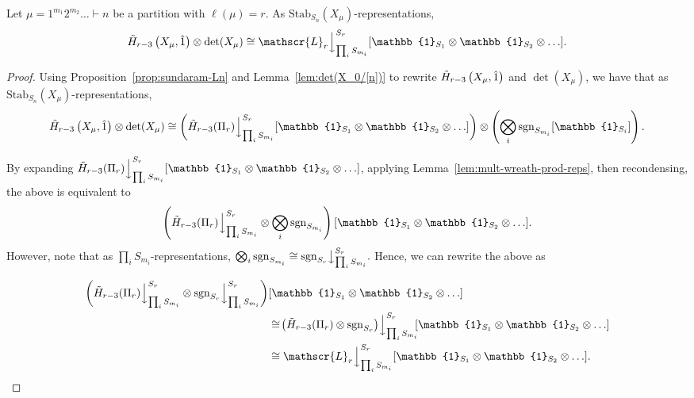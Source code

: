 \documentclass[ALCO, Unicode]{cedram}
\def\stab{\mathrm{Stab}}
\def\sgn{\mathrm{sgn}}
\begin{document}
\begin{coro}\label{lem:upper-interval-stabilizer-rep}
    Let $\mu = 1^{m_1}2^{m_2}\ldots \vdash n$ be a partition with $\ell(\mu) = r.$ As $\stab_{S_n}(X_\mu)$-representations,
    \begin{align*}
        \Tilde{H}_{r - 3}\left(X_\mu, \hat{1}\right) \otimes \det(X_\mu) \cong \mathscr{L}_r \Big \downarrow^{S_r}_{\prod_{i} S_{m_i}}[\mathbb{1}_{S_1} \otimes \mathbb{1}_{S_2} \otimes \ldots].
    \end{align*}
\end{coro}
\begin{proof}
     Using Proposition~\ref{prop:sundaram-Ln} and Lemma~\ref{lem:det(X_0/[n])} to rewrite $\Tilde{H}_{r - 3}\left(X_\mu, \hat{1}\right)$ and $\det(X_\mu)$, we have that as $\stab_{S_n}(X_\mu)$-representations,
 {\small \begin{align*}
     \Tilde{H}_{r - 3}\left(X_\mu, \hat{1}\right) \otimes \det(X_\mu) \cong \left(\Tilde{H}_{r - 3}(\Pi_r) \Big \downarrow^{S_r}_{\prod_{i} S_{m_i}}[\mathbb{1}_{S_1} \otimes \mathbb{1}_{S_2} \otimes \ldots ]\right) \otimes \left(\bigotimes_i \sgn_{S_{m_i}}[\mathbb{1}_{S_i}]\right).
 \end{align*}}

 By expanding $\Tilde{H}_{r - 3}(\Pi_r) \Big \downarrow^{S_r}_{\prod_{i} S_{m_i}}[\mathbb{1}_{S_1} \otimes \mathbb{1}_{S_2} \otimes \ldots ]$, applying Lemma~\ref{lem:mult-wreath-prod-reps}, then recondensing, the above is equivalent to
\begin{align*}
    \left(\Tilde{H}_{r - 3}(\Pi_r) \Big \downarrow^{S_r}_{\prod_{i} S_{m_i}} \otimes \bigotimes_i \sgn_{S_{m_i}}\right)[\mathbb{1}_{S_1} \otimes \mathbb{1}_{S_2} \otimes \ldots ].
\end{align*}
However, note that as $\prod_i S_{m_i}$-representations, $\bigotimes_i \sgn_{S_{m_i}} \cong \sgn_{S_r} \big\downarrow^{S_r}_{\prod_iS_{m_i}}.$ Hence, we can rewrite the above as 
 
\begin{align*}
     \left(\Tilde{H}_{r - 3}(\Pi_r) \Big \downarrow^{S_r}_{\prod_{i} S_{m_i}} \otimes \sgn_{S_r} \Big \downarrow^{S_r}_{\prod_i S_{m_i}}\right)&[\mathbb{1}_{S_1} \otimes \mathbb{1}_{S_2} \otimes \ldots ]\\
     &\cong\! \left(\Tilde{H}_{r - 3}(\Pi_r) \otimes \sgn_{S_r} \right)\!\Big \downarrow^{S_r}_{\prod_{i } S_{m_i}}\!\![\mathbb{1}_{S_1} \otimes \mathbb{1}_{S_2} \otimes \ldots]\\
     &\cong \mathscr{L}_r \Big \downarrow^{S_r}_{\prod_{i} S_{m_i}}[\mathbb{1}_{S_1} \otimes \mathbb{1}_{S_2} \otimes \ldots].
    \end{align*}
\end{proof}
\end{document}
